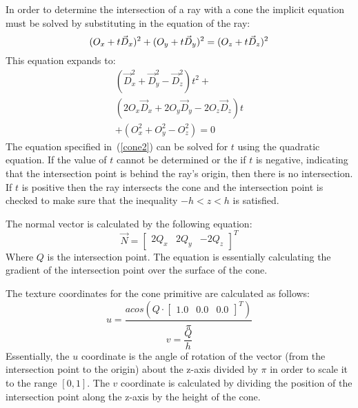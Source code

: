 In order to determine the intersection of a ray with a cone the implicit
equation must be solved by substituting in the equation of the ray:
\begin{equation}
  (O_{x} + t\vec{D}_{x})^2 + \\
  (O_{y} + t\vec{D}_{y})^2 = \\
  (O_{z} + t\vec{D}_{z})^2
\end{equation}
This equation expands to:
\begin{equation}
\begin{split}
  (\vec{D}_{x}^2 + \vec{D}_{y}^2 - \vec{D}_{z}^2)t^2 + \\
  (2O_{x}\vec{D}_{x} + 2O_{y}\vec{D}_{y} - 
  2O_{z}\vec{D}_{z})t \\
  + (O_{x}^2 + O_{y}^2 - O_{z}^2) = 0\label{cone2}
\end{split}
\end{equation}
The equation specified in~(\ref{cone2}) can be solved for $t$ using the
quadratic equation. If the value of $t$ cannot be determined or the if $t$ is
negative, indicating that the intersection point is behind the ray's origin,
then there is no intersection. If $t$ is positive then the ray intersects the
cone and the intersection point is checked to make sure that the inequality $-h
< z < h$ is satisfied.

The normal vector is calculated by the following equation:
\begin{equation}
  \vec{N} = \begin{bmatrix} 2Q_{x} & 2Q_{y} & -2Q_{z}
  \end{bmatrix}^{T}
\end{equation}
Where $Q$ is the intersection point. The equation is essentially calculating the
gradient of the intersection point over the surface of the cone.

The texture coordinates for the cone primitive are calculated as follows:
\begin{equation}
  u = \frac{acos(Q \cdot \begin{bmatrix} 1.0 & 0.0 & 0.0 \end{bmatrix}^{T})}
  {\pi}
\end{equation}
\begin{equation}
  v = \frac{Q}{h}
\end{equation}
Essentially, the $u$ coordinate is the angle of rotation of the vector (from
the intersection point to the origin) about the z-axis divided by $\pi$ in 
order to scale it to the range $[0, 1]$. The $v$ coordinate is calculated by
dividing the position of the intersection point along the z-axis by the height
of the cone.

